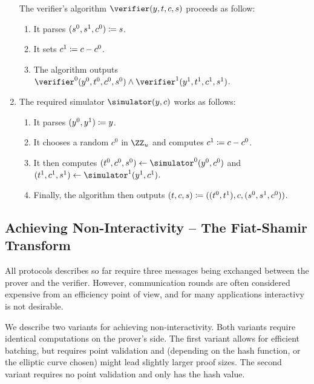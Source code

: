 \documentclass[runningheads]{llncs}
\begin{document}
\begin{enumerate}
    The verifier's algorithm $\verifier(y,t,c,s)$ proceeds as follow:
    \begin{enumerate}
      \item
        It  parses $(s^0,s^1,c^0)\coloneqq s$.
      \item
        It sets $c^1\coloneqq c-c^0$.
      \item
	The algorithm outputs $\verifier^0(y^0,t^0,c^0,s^0)\land\verifier^1(y^1,t^1,c^1,s^1)$.
    \end{enumerate}
  \item
    The required simulator $\simulator(y,c)$ works as follows:
    \begin{enumerate}
      \item
        It parses $(y^0,y^1)\coloneqq y$.
      \item
        It chooses a random $c^0$ in $\ZZ_u$ and computes $c^1\coloneqq c-c^0$.
      \item
        It then computes $(t^0,c^0,s^0)\gets\simulator^0(y^0,c^0)$ and $(t^1,c^1,s^1)\gets\simulator^1(y^1,c^1)$.
      \item
        Finally, the algorithm then outputs $(t,c,s)\coloneqq((t^0,t^1),c,(s^0,s^1,c^0))$.
    \end{enumerate}
\end{enumerate}


\subsection{Achieving Non-Interactivity -- The Fiat-Shamir Transform}
All protocols describes so far require three messages being exchanged between the prover and the verifier.
However, communication rounds are often considered expensive from an efficiency point of view, and for many applications interactivy is not desirable.

We describe two variants for achieving non-interactivity. Both variants require identical computations on the prover's side.
The first variant allows for efficient batching, but requires point validation and (depending on the hash function, or the elliptic curve chosen) might lead
slightly larger proof sizes. The second variant requires no point validation and only has the hash value.
\end{document}

